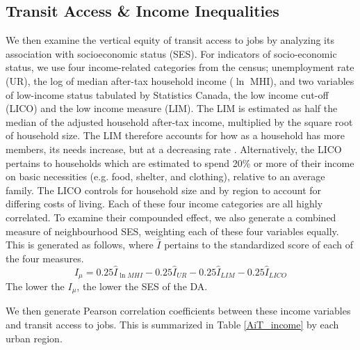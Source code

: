 \documentclass[11 pt, letterpaper]{article}
\begin{document}
{\subsection{Transit Access \& Income Inequalities}

We then examine the vertical equity of transit access to jobs by analyzing its association with socioeconomic status (SES). For indicators of socio-economic status, we use four income-related categories from the census; unemployment rate (UR), the log of median after-tax household income ($\ln$ MHI), and two variables of low-income status tabulated by Statistics Canada, the low income cut-off (LICO) and the low income measure (LIM). The LIM is estimated as half the median of the adjusted household after-tax income, multiplied by the square root of household size. The LIM therefore accounts for how as a household has more members, its needs increase, but at a decreasing rate \cite{sc2016cdic}. Alternatively, the LICO pertains to households which are estimated to spend 20\% or more of their income on basic necessities (e.g. food, shelter, and clothing), relative to an average family. The LICO controls for household size and by region to account for differing costs of living. Each of these four income categories are all highly correlated. To examine their compounded effect, we also generate a combined measure of neighbourhood SES, weighting each of these four variables equally. This is generated as follows, where $\hat I$ pertains to the standardized score of each of the four measures.
\begin{equation}
I_\mu = 0.25 \hat I_{\ln MHI} - 0.25 \hat I_{UR} - 0.25 \hat I_{LIM} - 0.25 \hat I_{LICO}
\end{equation}
The lower the $I_\mu$, the lower the SES of the DA. 

We then generate Pearson correlation coefficients between these income variables and transit access to jobs. This is summarized in Table \ref{AiT_income} by each urban region.

}
\end{document}
